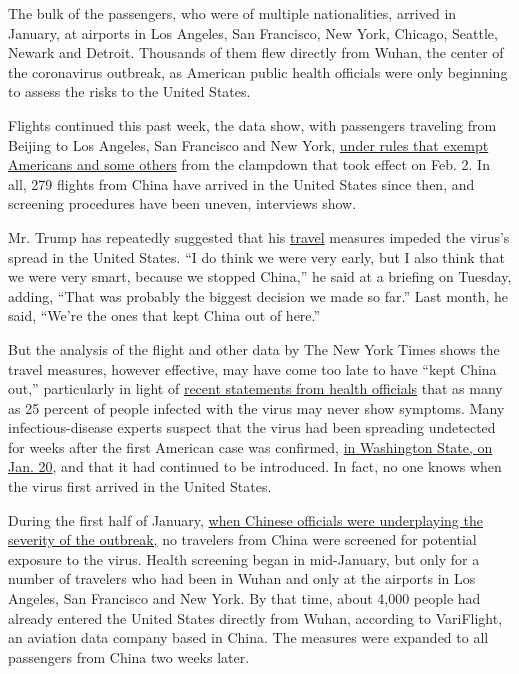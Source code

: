 The bulk of the passengers, who were of multiple nationalities, arrived
in January, at airports in Los Angeles, San Francisco, New York,
Chicago, Seattle, Newark and Detroit. Thousands of them flew directly
from Wuhan, the center of the coronavirus outbreak, as American public
health officials were only beginning to assess the risks to the United
States.

Flights continued this past week, the data show, with passengers
traveling from Beijing to Los Angeles, San Francisco and New York,
\href{https://www.whitehouse.gov/presidential-actions/proclamation-suspension-entry-immigrants-nonimmigrants-persons-pose-risk-transmitting-2019-novel-coronavirus/}{under
rules that exempt Americans and some others} from the clampdown that
took effect on Feb. 2. In all, 279 flights from China have arrived in
the United States since then, and screening procedures have been uneven,
interviews show.

Mr. Trump has repeatedly suggested that his
\href{https://www.nytimes3xbfgragh.onion/2020/04/15/travel/q-and-a-coronavirus-travel.html}{travel}
measures impeded the virus's spread in the United States. ``I do think
we were very early, but I also think that we were very smart, because we
stopped China,'' he said at a briefing on Tuesday, adding, ``That was
probably the biggest decision we made so far.'' Last month, he said,
``We're the ones that kept China out of here.''

But the analysis of the flight and other data by The New York Times
shows the travel measures, however effective, may have come too late to
have ``kept China out,'' particularly in light of
\href{https://www.nytimes3xbfgragh.onion/2020/03/31/health/coronavirus-asymptomatic-transmission.html}{recent
statements from health officials} that as many as 25 percent of people
infected with the virus may never show symptoms. Many infectious-disease
experts suspect that the virus had been spreading undetected for weeks
after the first American case was confirmed,
\href{https://www.nejm.org/doi/full/10.1056/NEJMoa2001191}{in Washington
State, on Jan. 20}, and that it had continued to be introduced. In fact,
no one knows when the virus first arrived in the United States.

During the first half of January,
\href{https://www.nytimes3xbfgragh.onion/2020/02/01/world/asia/china-coronavirus.html}{when
Chinese officials were underplaying the severity of the outbreak,} no
travelers from China were screened for potential exposure to the virus.
Health screening began in mid-January, but only for a number of
travelers who had been in Wuhan and only at the airports in Los Angeles,
San Francisco and New York. By that time, about 4,000 people had already
entered the United States directly from Wuhan, according to VariFlight,
an aviation data company based in China. The measures were expanded to
all passengers from China two weeks later.

